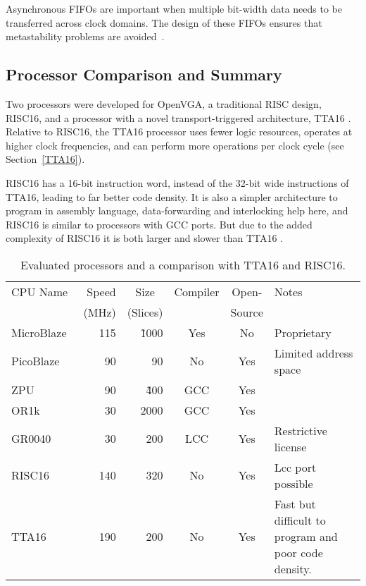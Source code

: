 Asynchronous FIFOs are important when multiple bit-width data needs to be
transferred across clock domains. The design of these FIFOs ensures that
metastability problems are avoided~\cite{Async_FIFO2}.


\subsection{Processor Comparison and Summary}
\label{SUMMARY_CPU}
Two processors were developed for OpenVGA, a traditional RISC design, RISC16,
and a processor with a novel transport-triggered architecture, TTA16 . Relative
to RISC16, the TTA16 processor uses fewer logic resources, operates at higher clock
frequencies, and can perform more operations per clock cycle (see
Section~\ref{TTA16}).

RISC16 has a 16-bit instruction word, instead of the 32-bit wide instructions of
TTA16, leading to far better code density. It is also a simpler architecture to
program in assembly language, data-forwarding and interlocking help here, and
RISC16 is similar to processors with GCC ports. But due to the added complexity
of RISC16 it is both larger and slower than TTA16 .


\begin{table}[h!]
\begin{center}
\begin{tabular}{l | r r c c l}
CPU Name & Speed & \multicolumn{1}{c}{Size} & Compiler & Open- &
Notes \\

	& \multicolumn{1}{c}{(MHz)}	& \multicolumn{1}{c}{(Slices)} & & Source & \\
\hline

MicroBlaze~\cite{xilinx2008mpr} & 115 & \~1000 & Yes & No & Proprietary \\

PicoBlaze~\cite{xilinx2008ppr} & 90 & 90 & No & Yes & Limited address space \\

ZPU~\cite{ZPU} & 90 & \~400 & GCC & Yes &	\\

OR1k~\cite{OpenRISC} & 30 & 2000 & GCC & Yes &	\\

GR0040~\cite{FPGACPU} & 30 & 200 & LCC & Yes & Restrictive license \\

RISC16 & 140 & 320 & No & Yes & Lcc port possible	\\

TTA16 & 190 & 200 & No & Yes & \begin{minipage}{0.3\linewidth} Fast but
difficult to program and poor code density. \end{minipage} \\

\end{tabular}
\caption[Evalualted processors and a comparison with TTA16 and
RISC16]{Evaluated processors and a comparison with TTA16 and RISC16.}
\label{SUMMARY_CPU_Table}
\end{center}
\end{table}

